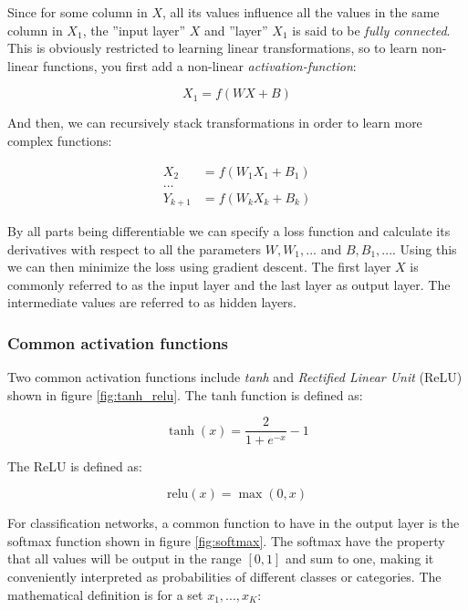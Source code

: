 Since for some column in $X$, all its values influence all the values in the
same column in $X_1$, the ''input layer'' $X$ and ''layer'' $X_1$ is said to be
\textit{fully connected}. This is obviously restricted to learning linear
transformations, so to learn non-linear functions, you first add a non-linear
\textit{activation-function}:

\begin{equation}
    X_1 = f(WX + B)
\end{equation}

And then, we can recursively stack transformations in order to learn more complex
functions:

\begin{align}
    X_2 &= f(W_1X_1 + B_1)\\
    ...\\
    Y_{k+1} &= f(W_kX_k + B_k)
\end{align}

By all parts being differentiable we can specify a loss function and calculate
its derivatives with respect to all the parameters $W, W_1,...$ and $B, B_1,
...$. Using this we can then minimize the loss using gradient descent. The first
layer $X$ is commonly referred to as the input layer and the last layer as output
layer. The intermediate values are referred to as hidden layers.

\subsubsection{Common activation functions}

Two common activation functions include \textit{tanh} and \textit{Rectified
Linear Unit} (ReLU) \cite{jarrett2009best} shown in figure \ref{fig:tanh_relu}. The tanh function is defined as:

\begin{equation}
    \tanh(x) = \frac{2}{1+e^{-x}} - 1
\end{equation}

The ReLU is defined as:

\begin{equation}
    \text{relu}(x) = \max (0, x)
\end{equation}

For classification networks, a common function to have in the output layer is
the softmax function shown in figure \ref{fig:softmax}. The softmax have the
property that all values will be output in the range $[0, 1]$ and sum to one,
making it conveniently interpreted as probabilities of different classes or
categories. The mathematical definition is for a set $x_1, ..., x_K$:

